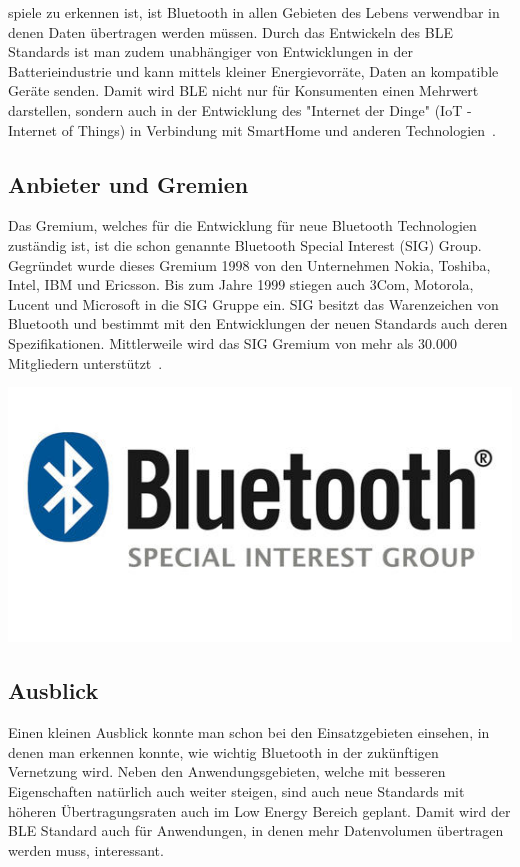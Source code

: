 \begin{multicols}{3}

spiele zu erkennen ist, ist Bluetooth in allen Gebieten des Lebens verwendbar in denen Daten übertragen werden müssen. Durch das Entwickeln des BLE Standards ist man zudem unabhängiger von Entwicklungen in der Batterieindustrie und kann mittels kleiner Energievorräte, Daten an kompatible Geräte senden. Damit wird BLE nicht nur für Konsumenten einen Mehrwert darstellen, sondern auch in der Entwicklung des "Internet der Dinge" (IoT - Internet of Things) in Verbindung mit SmartHome und anderen Technologien~\cite{BLE.1}.

\subsection*{Anbieter und Gremien}
Das Gremium, welches für die Entwicklung für neue Bluetooth Technologien zuständig ist, ist die schon genannte Bluetooth Special Interest (SIG) Group. Gegründet wurde dieses Gremium 1998 von den Unternehmen Nokia, Toshiba, Intel, IBM und Ericsson. Bis zum Jahre 1999 stiegen auch 3Com, Motorola, Lucent und Microsoft in die SIG Gruppe ein. SIG besitzt das Warenzeichen von Bluetooth und bestimmt mit den Entwicklungen der neuen Standards auch deren Spezifikationen. Mittlerweile wird das SIG Gremium von mehr als 30.000 Mitgliedern unterstützt~\cite{BLE.1}.

\begin{Figure}
\includegraphics[width=\linewidth]{Kapitel/BLE/Grafiken/BluetoothSIGLogo.jpg}
\end{Figure}

\subsection*{Ausblick}
Einen kleinen Ausblick konnte man schon bei den Einsatzgebieten einsehen, in denen man erkennen konnte, wie wichtig Bluetooth in der zukünftigen Vernetzung wird. Neben den Anwendungsgebieten, welche mit besseren Eigenschaften natürlich auch weiter steigen, sind auch neue Standards mit höheren Übertragungsraten auch im Low Energy Bereich geplant. Damit wird der BLE Standard auch für Anwendungen, in denen mehr Datenvolumen übertragen werden muss, interessant.


\end{multicols}
